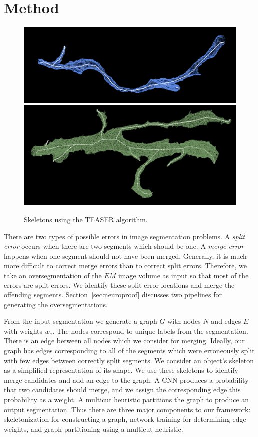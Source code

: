 \section{Method}


\begin{figure}[t]
	\centering
	\includegraphics[width=0.92\linewidth]{./figures/skeleton1.png}
	\includegraphics[width=0.92\linewidth]{./figures/skeleton2.png}
	\caption{Skeletons using the TEASER algorithm.}
	\label{fig:skeletonization}
\end{figure}

There are two types of possible errors in image segmentation problems.
A \textit{split error} occurs when there are two segments which should be one. 
A \textit{merge error} happens when one segment should not have been merged. 
Generally, it is much more difficult to correct merge errors than to correct split errors. 
Therefore, we take an oversegmentation of the $EM$ image volume as input so that most of the errors are split errors. 
We identify these split error locations and merge the offending segments.
Section~\ref{sec:neuroproof} discusses two pipelines for generating the oversegmentations. 

From the input segmentation we generate a graph $G$ with nodes $N$ and edges $E$ with weights $w_e$. 
The nodes correspond to unique labels from the segmentation.
There is an edge between all nodes which we consider for merging. 
Ideally, our graph has edges corresponding to all of the segments which were erroneously split with few edges between correctly split segments.
We consider an object's skeleton as a simplified representation of its shape.
We use these skeletons to identify merge candidates and add an edge to the graph.
A CNN produces a probability that two candidates should merge, and we assign the corresponding edge this probability as a weight. 
A multicut heuristic partitions the graph to produce an output segmentation.
Thus there are three major components to our framework: skeletonization for constructing a graph, network training for determining edge weights, and graph-partitioning using a multicut heuristic.

